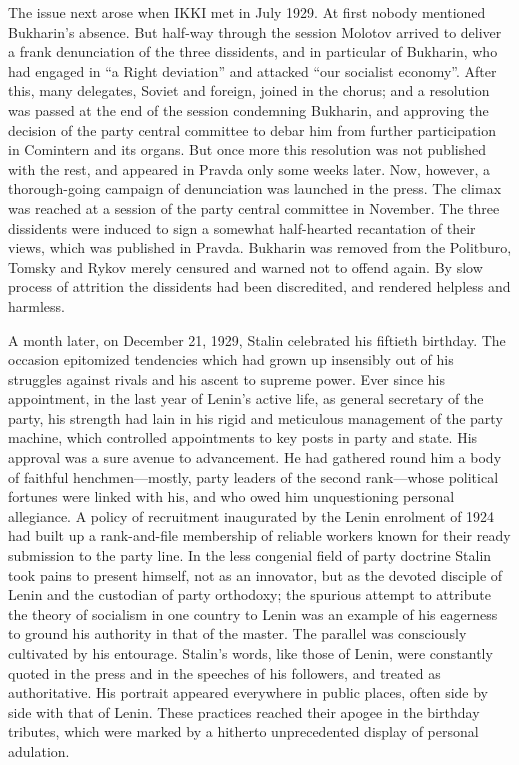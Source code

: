 The issue next arose when IKKI met in July 1929. At first nobody mentioned Bukharin's absence. But half-way through the session Molotov arrived to deliver a frank denunciation of the three dissidents, and in particular of Bukharin, who had engaged in ``a Right deviation'' and attacked ``our socialist economy''. After this, many delegates, Soviet and foreign, joined in the chorus; and a resolution was passed at the end of the session condemning Bukharin, and approving the decision of the party central committee to debar him from further participation in Comintern and its organs. But once more this resolution was not published with the rest, and appeared in Pravda only some weeks later. Now, however, a thorough-going campaign of denunciation was launched in the press. The climax was reached at a session of the party central committee in November. The three dissidents were induced to sign a somewhat half-hearted recantation of their views, which was published in Pravda. Bukharin was removed from the Politburo, Tomsky and Rykov merely censured and warned not to offend again. By slow process of attrition the dissidents had been discredited, and rendered helpless and harmless. 

A month later, on December 21, 1929, Stalin celebrated his fiftieth birthday. The occasion epitomized tendencies which had grown up insensibly out of his struggles against rivals and his ascent to supreme power. Ever since his appointment, in the last year of Lenin's active life, as general secretary of the party, his strength had lain in his rigid and meticulous management of the party machine, which controlled appointments to key posts in party and state. His approval was a sure avenue to advancement. He had gathered round him a body of faithful henchmen---mostly, party leaders of the second rank---whose political fortunes were linked with his, and who owed him unquestioning personal allegiance. A policy of recruitment inaugurated by the Lenin enrolment of 1924 had built up a rank-and-file membership of reliable workers known for their ready submission to the party line. In the less congenial field of party doctrine Stalin took pains to present himself, not as an innovator, but as the devoted disciple of Lenin and the custodian of party orthodoxy; the spurious attempt to attribute the theory of socialism in one country to Lenin was an example of his eagerness to ground his authority in that of the master. The parallel was consciously cultivated by his entourage. Stalin's words, like those of Lenin, were constantly quoted in the press and in the speeches of his followers, and treated as authoritative. His portrait appeared everywhere in public places, often side by side with that of Lenin. These practices reached their apogee in the birthday tributes, which were marked by a hitherto unprecedented display of personal adulation. 

